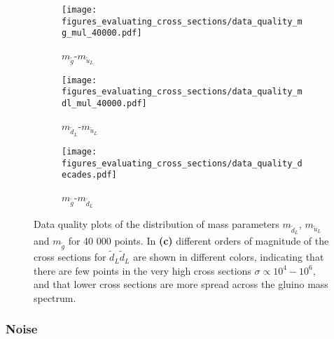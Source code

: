 \documentclass[twoside,english]{uiofysmaster}
\begin{document}
\begin{figure}
    \centering
    \begin{subfigure}[b]{0.45\textwidth}
        \texttt{[image: figures\_evaluating\_cross\_sections/data\_quality\_mg\_mul\_40000.pdf]}
        \caption{$m_{\tilde{g}}$-$m_{\tilde{u}_L}$}
        \label{Fig:: evaluating cross : Data quality mgul}
    \end{subfigure}
    \begin{subfigure}[b]{0.45\textwidth}
        \texttt{[image: figures\_evaluating\_cross\_sections/data\_quality\_mdl\_mul\_40000.pdf]}
        \caption{$m_{\tilde{d}_L}$-$m_{\tilde{u}_L}$}
        \label{Fig:: evaluating cross : Data quality dlul}
    \end{subfigure}
    \begin{subfigure}[b]{0.75\textwidth}
        \centering
        \texttt{[image: figures\_evaluating\_cross\_sections/data\_quality\_decades.pdf]}
        \caption{$m_{\tilde{g}}$-$m_{\tilde{d}_L}$}
        \label{Fig:: evaluating cross : Data quality mgdl decades}
    \end{subfigure}
    \caption{Data quality plots of the distribution of mass parameters $m_{\tilde{d}_L}$, $m_{\tilde{u}_L}$ and $m_{\tilde{g}}$ for 40 000 points. In \textbf{(c)} different orders of magnitude of the cross sections for $\tilde{d}_L \tilde{d}_L$ are shown in different colors, indicating that there are few points in the very high cross sections $\sigma \propto 10^{4}-10^{6}$, and that lower cross sections are more spread across the gluino mass spectrum. }
    \label{Fig:: evaluating cross : Data quality}
\end{figure}

\subsubsection{Noise}\label{Sec:: evaluating cross : Noise}
\end{document}
